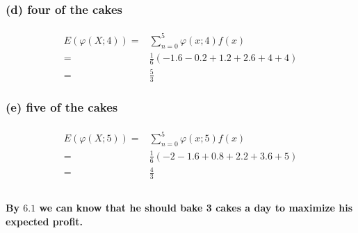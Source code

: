 \documentclass{article}
\begin{document}
            \subsubsection*{   (d) four of the cakes}
            \paragraph{
                \begin{equation*}
                    \begin{split}
                        E(\varphi(X;4))=&\sum _{n=0} ^5 \varphi(x;4)f(x)\\
                                    =&\frac{1}{6}(-1.6-0.2+1.2+2.6+4+4)\\
                                    =&\frac{5}{3}
                    \end{split}
                \end{equation*}
            }
            \subsubsection*{    (e) five of the cakes}
            \paragraph{
                \begin{equation*}
                    \begin{split}
                        E(\varphi(X;5))=&\sum _{n=0} ^5 \varphi(x;5)f(x)\\
                                    =&\frac{1}{6}(-2-1.6+0.8+2.2+3.6+5)\\
                                    =&\frac{4}{3}
                    \end{split}
                \end{equation*}
            }
        \subsection{}
            \paragraph{
                By $6.1$ we can know that he should bake 3 cakes a day to maximize his expected profit.
            }
    
    \section{}
        \paragraph{
            \begin{equation*}
                \begin{split}
                    
                \end{split}
            \end{equation*}
        }
\end{document}
